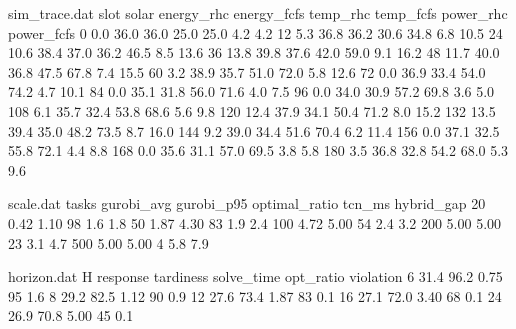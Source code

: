 
\begin{filecontents*}{sim_trace.dat}
slot solar energy_rhc energy_fcfs temp_rhc temp_fcfs power_rhc power_fcfs
0   0.0 36.0 36.0 25.0 25.0 4.2 4.2
12  5.3 36.8 36.2 30.6 34.8 6.8 10.5
24 10.6 38.4 37.0 36.2 46.5 8.5 13.6
36 13.8 39.8 37.6 42.0 59.0 9.1 16.2
48 11.7 40.0 36.8 47.5 67.8 7.4 15.5
60  3.2 38.9 35.7 51.0 72.0 5.8 12.6
72  0.0 36.9 33.4 54.0 74.2 4.7 10.1
84  0.0 35.1 31.8 56.0 71.6 4.0 7.5
96  0.0 34.0 30.9 57.2 69.8 3.6 5.0
108 6.1 35.7 32.4 53.8 68.6 5.6 9.8
120 12.4 37.9 34.1 50.4 71.2 8.0 15.2
132 13.5 39.4 35.0 48.2 73.5 8.7 16.0
144  9.2 39.0 34.4 51.6 70.4 6.2 11.4
156  0.0 37.1 32.5 55.8 72.1 4.4 8.8
168  0.0 35.6 31.1 57.0 69.5 3.8 5.8
180  3.5 36.8 32.8 54.2 68.0 5.3 9.6
\end{filecontents*}

\begin{filecontents*}{scale.dat}
tasks gurobi_avg gurobi_p95 optimal_ratio tcn_ms hybrid_gap
20  0.42 1.10 98  1.6 1.8
50  1.87 4.30 83  1.9 2.4
100 4.72 5.00 54  2.4 3.2
200 5.00 5.00 23  3.1 4.7
500 5.00 5.00  4  5.8 7.9
\end{filecontents*}

\begin{filecontents*}{horizon.dat}
H response tardiness solve_time opt_ratio violation
6  31.4 96.2 0.75 95 1.6
8  29.2 82.5 1.12 90 0.9
12 27.6 73.4 1.87 83 0.1
16 27.1 72.0 3.40 68 0.1
24 26.9 70.8 5.00 45 0.1
\end{filecontents*}

\documentclass[conference]{IEEEtran}

\usepackage[UTF8,scheme=plain,fontset=fandol]{ctex}
\usepackage{amsmath,amssymb,bm}
\usepackage{booktabs,multirow,array,tabularx}
\usepackage{graphicx}
\usepackage{xcolor}
\usepackage{tikz}
\usepackage{pgfplots}
\usepackage{algorithm}
\usepackage{algpseudocode}
\usepackage{url}
\usepackage[hidelinks]{hyperref}
\usepackage{cite}

\usetikzlibrary{arrows.meta,positioning,shapes.geometric,calc,fit,backgrounds,patterns}
\pgfplotsset{compat=1.18}


